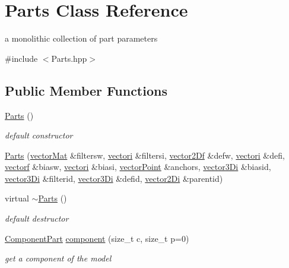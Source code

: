 \hypertarget{classParts}{\section{Parts Class Reference}
\label{classParts}
}


a monolithic collection of part parameters  




{\ttfamily \#include $<$Parts.\-hpp$>$}

\subsection*{Public Member Functions}
\begin{DoxyCompactItemize}
\item 
\hyperlink{classParts_a02ffe7271c4e268ee934710f91a203eb}{Parts} ()
\begin{DoxyCompactList}\small\item\em default constructor \end{DoxyCompactList}\item 
\hyperlink{classParts_ac8e1ad21c900825480d3f0e241808757}{Parts} (\hyperlink{types_8hpp_a3207a7addcfa415d1c83622febcb1e9b}{vector\-Mat} \&filtersw, \hyperlink{types_8hpp_a44529587d60e73bf0e689a82e5e70a55}{vectori} \&filtersi, \hyperlink{types_8hpp_a94f2d563f3725231a6f684b4dce4f1ef}{vector2\-Df} \&defw, \hyperlink{types_8hpp_a44529587d60e73bf0e689a82e5e70a55}{vectori} \&defi, \hyperlink{types_8hpp_a4da5db3ee9e284f719ef5764dbadffc8}{vectorf} \&biasw, \hyperlink{types_8hpp_a44529587d60e73bf0e689a82e5e70a55}{vectori} \&biasi, \hyperlink{types_8hpp_ac468fcf6870d6563ac8fa3669845afcc}{vector\-Point} \&anchors, \hyperlink{types_8hpp_a1f7c8ad00a53fb2d61b3656da9a6581d}{vector3\-Di} \&biasid, \hyperlink{types_8hpp_a1f7c8ad00a53fb2d61b3656da9a6581d}{vector3\-Di} \&filterid, \hyperlink{types_8hpp_a1f7c8ad00a53fb2d61b3656da9a6581d}{vector3\-Di} \&defid, \hyperlink{types_8hpp_a93a5e2cfd40d1ff1f10d8bbf11884c41}{vector2\-Di} \&parentid)
\item 
virtual \hyperlink{classParts_ac2df1f1a1d41444dff8ed4d4343aa64d}{$\sim$\-Parts} ()
\begin{DoxyCompactList}\small\item\em default destructor \end{DoxyCompactList}\item 
\hyperlink{classComponentPart}{Component\-Part} \hyperlink{classParts_ae4cd6034cce85efe0fa1b55bf5b2da47}{component} (size\-\_\-t c, size\-\_\-t p=0)
\begin{DoxyCompactList}\small\item\em get a component of the model \end{DoxyCompactList}\item 

\end{DoxyCompactItemize}
